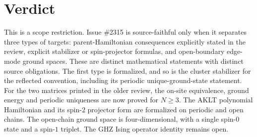 \documentclass{article}
\begin{document}
\section{Verdict}

This is a scope restriction. Issue \#2315 is source-faithful only when it
separates three types of targets: parent-Hamiltonian consequences explicitly
stated in the review, explicit stabilizer or spin-projector formulas, and
open-boundary edge-mode ground spaces. These are distinct mathematical
statements with distinct source obligations. The first type is formalized, and
so is the cluster stabilizer for the reflected convention, including its
periodic unique-ground-state statement. For the two matrices printed in the
older review, the on-site equivalence, ground energy and periodic uniqueness
are now proved for $N\ge3$. The AKLT polynomial Hamiltonian and its spin-$2$
projector form are formalized on periodic and open chains. The open-chain
ground space is four-dimensional, with a single spin-$0$ state and a
spin-$1$ triplet. The GHZ Ising operator identity remains open.



\end{document}

